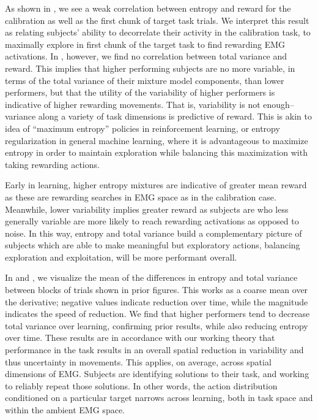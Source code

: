 \documentclass[../main.tex]{subfiles}
\begin{document}
As shown in , we see a weak correlation between entropy and reward for the calibration as well as the first chunk of target task trials. We interpret this result as relating subjects' ability to decorrelate their activity in the calibration task, to maximally explore in first chunk of the target task to find rewarding EMG activations. In , however, we find no correlation between total variance and reward. This implies that higher performing subjects are no more variable, in terms of the total variance of their mixture model components, than lower performers, but that the utility of the variability of higher performers is indicative of higher rewarding movements. That is, variability is not enough-- variance along a variety of task dimensions is predictive of reward. This is akin to idea of ``maximum entropy'' policies in reinforcement learning, or entropy regularization in general machine learning, where it is advantageous to maximize entropy in order to maintain exploration while balancing this maximization with taking rewarding actions.

Early in learning, higher entropy mixtures are indicative of greater mean reward as these are rewarding searches in EMG space as in the calibration case. Meanwhile, lower variability implies greater reward as subjects are who less generally variable are more likely to reach rewarding activations as opposed to noise. In this way, entropy and total variance build a complementary picture of subjects which are able to make meaningful but exploratory actions, balancing exploration and exploitation, will be more performant overall. 

In  and , we visualize the mean of the differences in entropy and total variance between blocks of trials shown in prior figures. This works as a coarse mean over the derivative; negative values indicate reduction over time, while the magnitude indicates the speed of reduction. We find that higher performers tend to decrease total variance over learning, confirming prior results, while also reducing entropy over time. These results are in accordance with our working theory that performance in the task results in an overall spatial reduction in variability and thus uncertainty in movements. This applies, on average, across spatial dimensions of EMG. Subjects are identifying solutions to their task, and working to reliably repeat those solutions. In other words, the action distribution conditioned on a particular target narrows across learning, both in task space and within the ambient EMG space.
\end{document}
